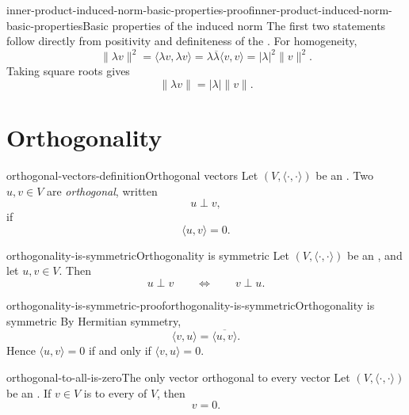\documentclass[preview]{standalone}
\begin{document}
\begin{snippetproof}{inner-product-induced-norm-basic-properties-proof}{inner-product-induced-norm-basic-properties}{Basic properties of the induced norm}
    The first two statements follow directly from positivity and
    definiteness of the \innerproduct. For homogeneity,
    \[
        \|\lambda v\|^2
        =
        \langle \lambda v,\lambda v\rangle
        =
        \lambda\overline{\lambda}\langle v,v\rangle
        =
        |\lambda|^2\|v\|^2.
    \]
    Taking square roots gives
    \[
        \|\lambda v\|=|\lambda|\|v\|.
    \]
\end{snippetproof}

\section{Orthogonality}

\begin{snippetdefinition}{orthogonal-vectors-definition}{Orthogonal vectors}
    Let \((V,\langle\cdot,\cdot\rangle)\) be an \innerproductspace. Two
    \vector[vectors] \(u,v\in V\) are \emph{orthogonal}, written
    \[
        u\perp v,
    \]
    if
    \[
        \langle u,v\rangle=0.
    \]
\end{snippetdefinition}

\begin{snippetproposition}{orthogonality-is-symmetric}{Orthogonality is symmetric}
    Let \((V,\langle\cdot,\cdot\rangle)\) be an \innerproductspace, and let
    \(u,v\in V\). Then
    \[
        u\perp v
        \qquad
        \Longleftrightarrow
        \qquad
        v\perp u.
    \]
\end{snippetproposition}

\begin{snippetproof}{orthogonality-is-symmetric-proof}{orthogonality-is-symmetric}{Orthogonality is symmetric}
    By Hermitian symmetry,
    \[
        \langle v,u\rangle=\overline{\langle u,v\rangle}.
    \]
    Hence \(\langle u,v\rangle=0\) if and only if
    \(\langle v,u\rangle=0\).
\end{snippetproof}

\begin{snippetproposition}{orthogonal-to-all-is-zero}{The only vector orthogonal to every vector}
    Let \((V,\langle\cdot,\cdot\rangle)\) be an \innerproductspace. If
    \(v\in V\) is \orthogonal to every \vector of \(V\), then
    \[
        v=0.
    \]
\end{snippetproposition}
\end{document}
